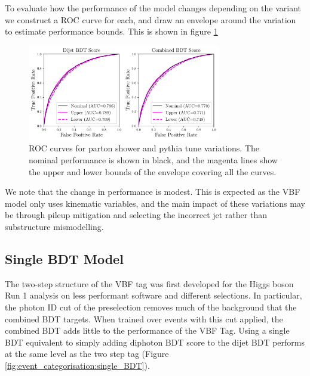 To evaluate how the performance of the model changes depending on the variant we construct a ROC curve for each, and draw an envelope around the variation to estimate performance bounds. This is shown in figure \ref{fig:event_categorisation:ps_variant_validation}
\begin{figure}[h!]
    \begin{center}
        \includegraphics[width=0.75\textwidth]{figures/event_selection/psvar_ROCs_PS.pdf}
    \end{center}
    \caption{ROC curves for parton shower and pythia tune variations. The nominal performance is shown in black, 
             and the magenta lines show the upper and lower bounds of the envelope covering all the curves.}
    \label{fig:event_categorisation:ps_variant_validation}
\end{figure}

We note that the change in performance is modest. This is expected as the VBF model only uses kinematic variables, and the main impact of these variations may be through pileup mitigation and selecting the incorrect jet rather than substructure mismodelling. 


\subsection{Single BDT Model}
The two-step structure of the VBF tag was first developed for the Higgs boson Run 1 analysis  on less performant software and different selections. 
In particular, the photon ID cut of the preselection removes much of the background that the combined BDT targets. 
When trained over events with this cut applied, the combined BDT adds little to the performance of the VBF Tag. 
Using a single BDT equivalent to simply adding diphoton BDT score to the dijet BDT performs at the same level as the two step tag (Figure \ref{fig:event_categorisation:single_BDT}).

